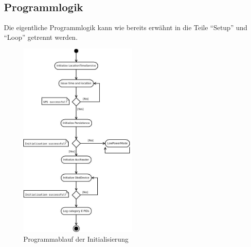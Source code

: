 \subsection{Programmlogik}
\label{subsec:ProgLogik}
Die eigentliche Programmlogik kann wie bereits erwähnt in die Teile \enquote{Setup} und \enquote{Loop} getrennt werden.
\begin{figure}[htp!]
	\begin{center}
		\includegraphics[width=\textwidth,height=10cm,keepaspectratio]{./img/Startup}
		\caption{Programmablauf der Initialisierung}
		\label{fig:setup}
	\end{center}
\end{figure}
